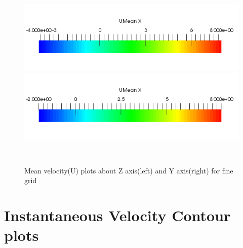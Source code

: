 \begin{figure}[H]
\begin{minipage}[b]{0.5\linewidth}
\includegraphics[scale=0.35]{figure/z_scale.png}
\end{minipage}
\begin{minipage}[b]{0.5\linewidth}
\includegraphics[scale=0.35]{figure/y_scale.png}
\end{minipage}\\

\caption{Mean velocity(U) plots about Z axis(left) and Y axis(right) for fine grid}
\label{fig:43}
\end{figure}


\section{Instantaneous Velocity Contour plots}



